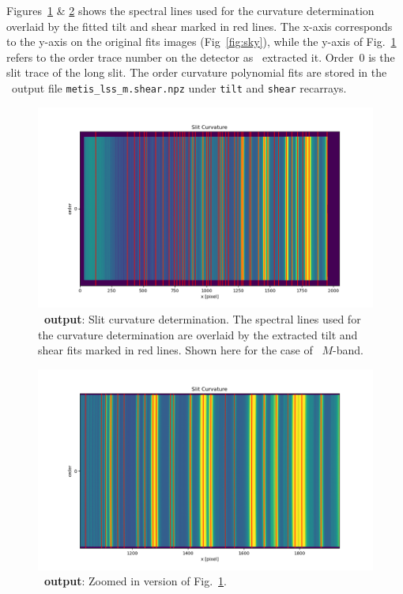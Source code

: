 Figures~\ref{fig:fig10} \& \ref{fig:fig10_z} shows the spectral lines used for the curvature determination  overlaid by the fitted tilt and shear marked in red lines. The x-axis corresponds to the y-axis on the original fits images (Fig~\ref{fig:sky}), while the y-axis of Fig.~\ref{fig:fig10} refers to the order trace number on the detector as \pyred~extracted it. Order~0 is the slit trace of the long slit. The order curvature polynomial fits are stored in the \pyred~output file \texttt{metis\_lss\_m.shear.npz} under \texttt{tilt} and \texttt{shear} recarrays.
\begin{figure}[!h]
  \centering
  \includegraphics[width=\textwidth]{figures/LSS_CrtAlg_files/Figure_10.png}
  \caption{\textbf{\pyred~output}: Slit curvature determination. The spectral lines used for the curvature determination are overlaid by the extracted tilt and shear fits marked in red lines. Shown here for the case of \lss~$M$-band.}
  \label{fig:fig10}
\end{figure}
\begin{figure}[!h]
  \centering
  \includegraphics[width=\textwidth]{figures/LSS_CrtAlg_files/Figure_10_z.png}
  \caption{\textbf{\pyred~output}: Zoomed in version of Fig.~\ref{fig:fig10}.}
  \label{fig:fig10_z}
\end{figure}
